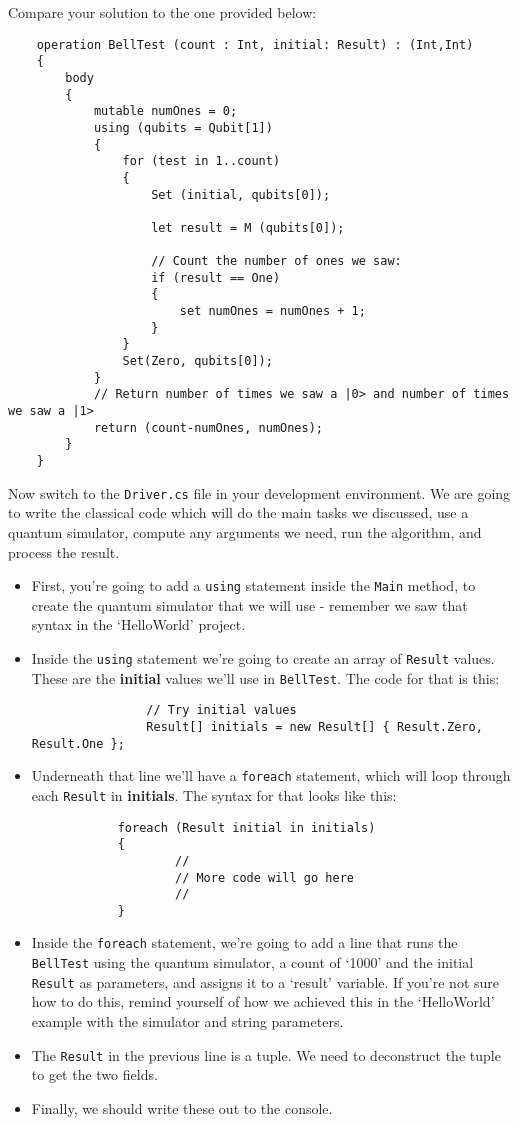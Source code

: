 \documentclass[a4paper]{article}
\begin{document}
Compare your solution to the one provided below:
\begin{lstlisting}
    operation BellTest (count : Int, initial: Result) : (Int,Int)
    {
        body
        {
            mutable numOnes = 0;
            using (qubits = Qubit[1])
            {
                for (test in 1..count)
                {
                    Set (initial, qubits[0]);

                    let result = M (qubits[0]);

                    // Count the number of ones we saw:
                    if (result == One)
                    {
                        set numOnes = numOnes + 1;
                    }
                }
                Set(Zero, qubits[0]);
            }
            // Return number of times we saw a |0> and number of times we saw a |1>
            return (count-numOnes, numOnes);
        }
    }
\end{lstlisting}

Now switch to the \verb$Driver.cs$ file in your development environment. We are going to write the classical code which will do the main tasks we discussed, use a quantum simulator, compute any arguments we need, run the algorithm, and process the result. 

\begin{itemize}
\item First, you're going to add a \verb$using$ statement inside the \verb$Main$ method, to create the quantum simulator that we will use - remember we saw that syntax in the `HelloWorld' project.
\item Inside the \verb$using$ statement we're going to create an array of \verb$Result$ values. These are the \textbf{initial} values we'll use in \verb$BellTest$. The code for that is this:
\begin{lstlisting}
                // Try initial values
                Result[] initials = new Result[] { Result.Zero, Result.One };
\end{lstlisting}
\item Underneath that line we'll have a \verb$foreach$ statement, which will loop through each \verb$Result$ in \textbf{initials}. The syntax for that looks like this:
\begin{lstlisting}
			foreach (Result initial in initials)
			{
					//
					// More code will go here
					//
			}
	\end{lstlisting}
\item Inside the \verb$foreach$ statement, we're going to add a line that runs the \verb$BellTest$ using the quantum simulator, a count of `1000' and the initial \verb$Result$ as parameters, and assigns it to a `result' variable. If you're not sure how to do this, remind yourself of how we achieved this in the `HelloWorld' example with the simulator and string parameters. 
\item The \verb$Result$ in the previous line is a tuple. We need to deconstruct the tuple to get the two fields.
\item Finally, we should write these out to the console. 
\end{itemize}
\end{document}
